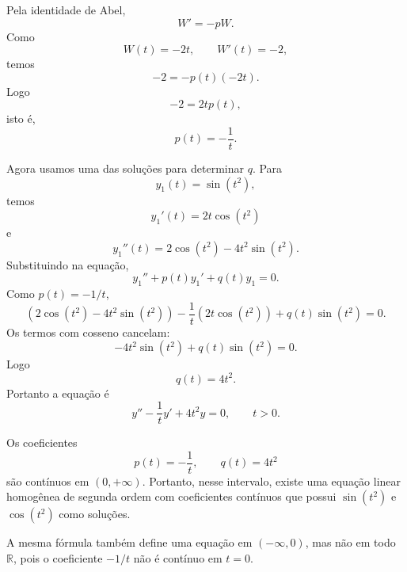 \documentclass[a4paper,11pt,reqno]{amsart}
\begin{document}
\begin{enumerate}
\begin{enumerate}
Pela identidade de Abel,
\[
    W'=-pW.
\]
Como
\[
    W(t)=-2t,
    \qquad
    W'(t)=-2,
\]
temos
\[
    -2=-p(t)(-2t).
\]
Logo
\[
    -2=2tp(t),
\]
isto é,
\[
    \boxed{p(t)=-\frac{1}{t}.}
\]

Agora usamos uma das soluções para determinar $q$. Para
\[
    y_1(t)=\sin(t^2),
\]
temos
\[
    y_1'(t)=2t\cos(t^2)
\]
e
\[
    y_1''(t)=2\cos(t^2)-4t^2\sin(t^2).
\]
Substituindo na equação,
\[
    y_1''+p(t)y_1'+q(t)y_1=0.
\]
Como $p(t)=-1/t$,
\[
    \left(2\cos(t^2)-4t^2\sin(t^2)\right)
    -
    \frac{1}{t}\left(2t\cos(t^2)\right)
    +
    q(t)\sin(t^2)
    =
    0.
\]
Os termos com cosseno cancelam:
\[
    -4t^2\sin(t^2)+q(t)\sin(t^2)=0.
\]
Logo
\[
    q(t)=4t^2.
\]
Portanto a equação é
\[
    \boxed{
        y''-\frac{1}{t}y'+4t^2y=0,
        \qquad
        t>0.
    }
\]

Os coeficientes
\[
    p(t)=-\frac1t,
    \qquad
    q(t)=4t^2
\]
são contínuos em $(0,+\infty)$. Portanto, nesse intervalo, existe uma equação linear homogênea de segunda ordem com coeficientes contínuos que possui $\sin(t^2)$ e $\cos(t^2)$ como soluções.

A mesma fórmula também define uma equação em $(-\infty,0)$, mas não em todo $\mathbb{R}$, pois o coeficiente $-1/t$ não é contínuo em $t=0$.

\end{enumerate}

\end{enumerate}
\end{document}
